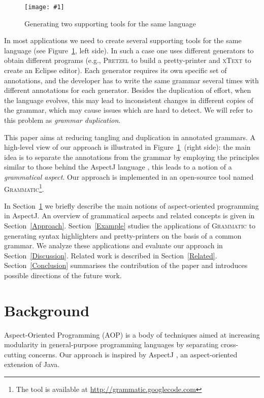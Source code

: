 \documentclass[10pt]{llncs}
\newcommand{\fig}[2]{%
\begin{figure}%
\centering%
\texttt{[image: \#1]}%
\caption{#2}\label{#1}%
\end{figure}%
}
\newcommand{\figref}[1]{Figure~\ref{#1}}
\newcommand{\secref}[1]{Section~\ref{#1}}
\newcommand{\tool}[1]{\textsc{#1}}
\newcommand{\Grammatic}[0]{\tool{Grammatic}}
\begin{document}
\fig{problems_and_solution}{Generating two supporting tools for the same language}
In most applications we need to create several supporting tools for the same language (see \figref{problems_and_solution}, left side). 
In such a case one uses different generators to obtain different programs (e.g., \tool{Pretzel} \cite{Pretzel} to build a pretty-printer and \tool{xText} \cite{Xtext} to create an Eclipse editor). Each generator requires its own specific set of annotations, and the developer has to write the same grammar several times with different annotations for each generator. Besides the duplication of effort, when the language evolves, this may lead to inconsistent changes in different copies of the grammar, which may cause issues which are hard to detect. We will refer to this problem as \emph{grammar duplication}.

This paper aims at reducing tangling and duplication in annotated grammars. 
A high-level view of our approach is illustrated in \figref{problems_and_solution}~(right side): the main idea is to separate the annotations from the grammar by employing the principles similar to those behind the AspectJ language \cite{AspectJ}, this leads to a notion of a \emph{grammatical aspect}. Our approach is implemented in an open-source tool named \Grammatic{}\footnote{The tool is available at \url{http://grammatic.googlecode.com}}. 

In \secref{Background} we briefly describe the main notions of aspect-oriented programming in AspectJ. 
An overview of grammatical aspects and related concepts is given in \secref{Approach}. 
\secref{Example} studies the applications of \Grammatic{} to generating syntax highlighters and pretty-printers on the basis of a common grammar. We analyze these applications and evaluate our approach in \secref{Discussion}. Related work is described in \secref{Related}. \secref{Conclusion} summarises the contribution of the paper and introduces possible directions of the future work.

\section{Background}\label{Background}
Aspect-Oriented Programming (AOP) is a body of techniques aimed at increasing modularity in general-purpose programming languages by separating cross-cutting concerns. Our approach is inspired by AspectJ \cite{AspectJ}, an aspect-oriented extension of Java. 
\end{document}
